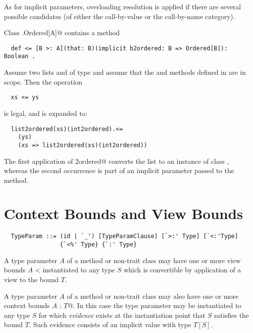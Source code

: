 As for implicit parameters, overloading resolution is applied
if there are several possible candidates (of either the call-by-value
or the call-by-name category).

\example\label{ex:impl-ordered} Class \lstinline@scala.Ordered[A]@ contains a method
\begin{lstlisting}
  def <= [B >: A](that: B)(implicit b2ordered: B => Ordered[B]): Boolean .
\end{lstlisting}
Assume two lists  and  of type 
and assume that the  and 
methods defined in  are in scope.
Then the operation
\begin{lstlisting}
  xs <= ys
\end{lstlisting}
is legal, and is expanded to:
\begin{lstlisting}
  list2ordered(xs)(int2ordered).<=
    (ys)
    (xs => list2ordered(xs)(int2ordered))
\end{lstlisting}
The first application of \lstinline@list2ordered@ converts the list
 to an instance of class , whereas the second 
occurrence is part of an implicit parameter passed to the \code{<=}
method.

\section{Context Bounds and View Bounds}\label{sec:context-bounds}

\syntax\begin{lstlisting}
  TypeParam ::= (id | `_') [TypeParamClause] [`>:' Type] [`<:'Type] 
                {`<%' Type} {`:' Type}
\end{lstlisting}

A type parameter $A$ of a method or non-trait class may have one or more view
bounds \lstinline@$A$ <% $T$@. In this case the type parameter may be
instantiated to any type $S$ which is convertible by application of a 
view to the bound $T$.

A type parameter $A$ of a method or non-trait class may also have one
or more context bounds \lstinline@$A$ : $T$@. In this case the type parameter may be
instantiated to any type $S$ for which {\em evidence} exists at the
instantiation point that $S$ satisfies the bound $T$. Such evidence
consists of an implicit value with type $T[S]$.

